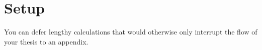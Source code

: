 \chapter{Setup}
\label{app:setup}

You can defer lengthy calculations that would otherwise only interrupt
the flow of your thesis to an appendix.
